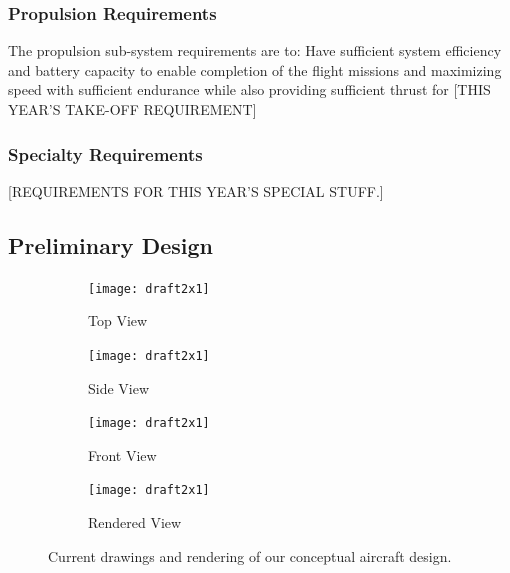\documentclass[proposal]{byu-aero}
\begin{document}
\subsubsection{Propulsion Requirements}
\label{sssec:PropulsionReqs}

The propulsion sub-system requirements are to: Have sufficient system efficiency and battery capacity to enable completion of the flight missions and maximizing speed with sufficient endurance while also providing sufficient thrust for {\color{BYUred}[THIS YEAR'S TAKE-OFF REQUIREMENT]}

\subsubsection{Specialty Requirements} %
\label{sssec:SpecialReqs}

{\color{BYUred}[REQUIREMENTS FOR THIS YEAR'S SPECIAL STUFF.]} 
\lipsum[2]



\subsection{Preliminary Design}
\label{ssec:PreliminaryDesign}

\begin{figure}[h!]
	\centering
	\begin{subfigure}[b]{0.475\textwidth}
		\texttt{[image: draft2x1]}
		\caption{Top View}
		\label{fig:topview}
	\end{subfigure}
	\begin{subfigure}[b]{0.475\textwidth}
		\texttt{[image: draft2x1]}
		\caption{Side View}
		\label{fig:sideview}
	\end{subfigure}

	\begin{subfigure}[b]{0.475\textwidth}
		\texttt{[image: draft2x1]}
		\caption{Front View}
		\label{fig:frontview}
	\end{subfigure}
	\begin{subfigure}[b]{0.475\textwidth}
		\texttt{[image: draft2x1]}
		\caption{Rendered View}
		\label{fig:renderedview}
	\end{subfigure}
	\caption{Current drawings and rendering of our conceptual aircraft design.}
	\label{fig:prelimdrawings}
\end{figure}
\end{document}
